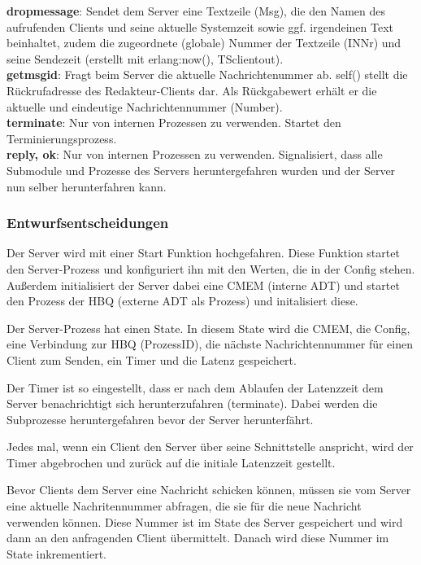 \documentclass{article}
\begin{document}
\textbf{dropmessage}: Sendet dem Server eine Textzeile (Msg), die den  Namen des aufrufenden Clients und seine aktuelle Systemzeit sowie ggf. irgendeinen Text beinhaltet, zudem die zugeordnete (globale) Nummer der Textzeile (INNr) und seine Sendezeit (erstellt mit erlang:now(), TSclientout).\\

\textbf{getmsgid}: Fragt beim Server die aktuelle Nachrichtenummer ab. self() stellt die Rückrufadresse des Redakteur-Clients dar. Als Rückgabewert erhält er die aktuelle und eindeutige Nachrichtennummer (Number).\\

\textbf{terminate}: Nur von internen Prozessen zu verwenden. Startet den Terminierungsprozess.\\

\textbf{{reply, ok}}: Nur von internen Prozessen zu verwenden. Signalisiert, dass alle Submodule und Prozesse des Servers
heruntergefahren wurden und der Server nun selber herunterfahren kann.\\

\subsubsection{Entwurfsentscheidungen}
Der Server wird mit einer Start Funktion hochgefahren. Diese Funktion startet den Server-Prozess und konfiguriert ihn
mit den Werten, die in der Config stehen. Außerdem initialisiert der Server dabei eine CMEM (interne ADT) und startet
den Prozess der HBQ (externe ADT als Prozess) und initalisiert diese.

Der Server-Prozess hat einen State. In diesem State wird die CMEM, die Config, eine Verbindung zur HBQ (ProzessID),
die nächste Nachrichtennummer für einen Client zum Senden, ein Timer und die Latenz gespeichert.

Der Timer ist so eingestellt, dass er nach dem Ablaufen der Latenzzeit dem Server benachrichtigt sich herunterzufahren
(terminate). Dabei werden die Subprozesse heruntergefahren bevor der Server herunterfährt.

Jedes mal, wenn ein Client den Server über seine Schnittstelle anspricht, wird der Timer abgebrochen und zurück auf die
initiale Latenzzeit gestellt.

Bevor Clients dem Server eine Nachricht schicken können, müssen sie vom Server eine aktuelle Nachritennummer abfragen,
die sie für die neue Nachricht verwenden können. Diese Nummer ist im State des Server gespeichert und wird dann an den
anfragenden Client übermittelt. Danach wird diese Nummer im State inkrementiert.
\end{document}
